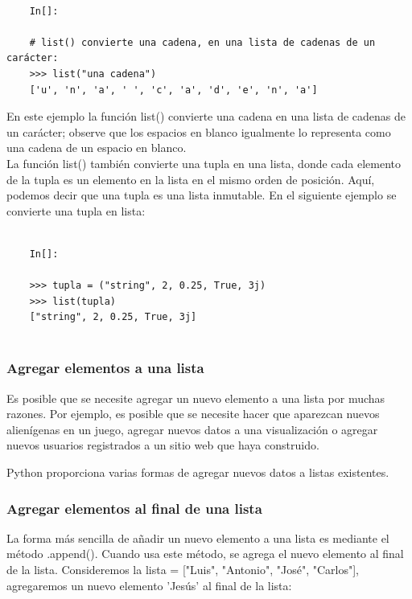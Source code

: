 \begin{lstlisting}
	
	In[]:
	
	# list() convierte una cadena, en una lista de cadenas de un carácter:	
	>>> list("una cadena")
	['u', 'n', 'a', ' ', 'c', 'a', 'd', 'e', 'n', 'a']
\end{lstlisting} En este ejemplo la función {\ttfamily list() } convierte una cadena en una lista de cadenas de un carácter; observe que los espacios en blanco igualmente lo representa como una cadena de un espacio en blanco.\\

La función {\ttfamily list()}  también  convierte una tupla en una lista, donde cada elemento de la tupla es un elemento en la lista en el mismo orden de posición. Aquí, podemos decir que una tupla es una lista inmutable.  En el siguiente ejemplo se convierte una tupla en lista:

\begin{lstlisting}
	
	In[]:
	
	>>> tupla = ("string", 2, 0.25, True, 3j)
	>>> list(tupla)
	["string", 2, 0.25, True, 3j]
	
\end{lstlisting}




\subsubsection{Agregar elementos a una lista}

Es posible que se necesite agregar un nuevo elemento a una lista por muchas razones. Por ejemplo, es posible que se necesite  hacer que aparezcan nuevos alienígenas en un juego, agregar nuevos datos a una visualización o agregar nuevos usuarios registrados a un sitio web que haya construido. 

Python proporciona varias formas de agregar nuevos datos a listas existentes.


\subsubsection{Agregar elementos al final de una lista}

La forma más sencilla de añadir  un nuevo elemento a una lista es mediante el método  {\ttfamily .append()}. Cuando usa este método,  se  agrega el nuevo elemento  al final de la lista. Consideremos la {\ttfamily lista = ["{}Luis", "{}Antonio", "{}José", "{}Carlos"{}]}, agregaremos un nuevo elemento {\ttfamily'Jesús'} al final de la lista:

